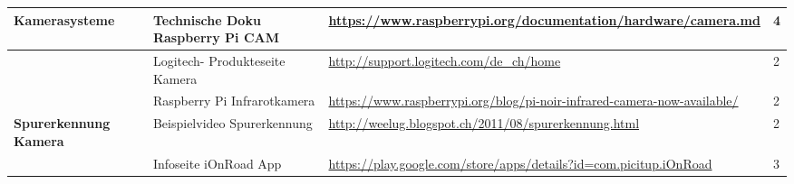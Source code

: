 \newpage
\begin{tabular}{|p{3cm}|p{3.5cm}|p{5cm}|p{2cm}|}\hline
\textbf{Kamerasysteme} & Technische Doku Raspberry Pi CAM & \url{https://www.raspberrypi.org/documentation/hardware/camera.md} & 4 \\ \hline
                    & Logitech- Produkteseite Kamera  & \url{http://support.logitech.com/de_ch/home} & 2 \\ \hline
                    & Raspberry Pi Infrarotkamera & \url{https://www.raspberrypi.org/blog/pi-noir-infrared-camera-now-available/} & 2\\ \hline                    
\textbf{Spurerkennung Kamera} & Beispielvideo Spurerkennung & \url{http://weelug.blogspot.ch/2011/08/spurerkennung.html} & 2\\ \hline
                              & Infoseite iOnRoad App & \url{https://play.google.com/store/apps/details?id=com.picitup.iOnRoad} & 3\\ \hline
\end{tabular}\\